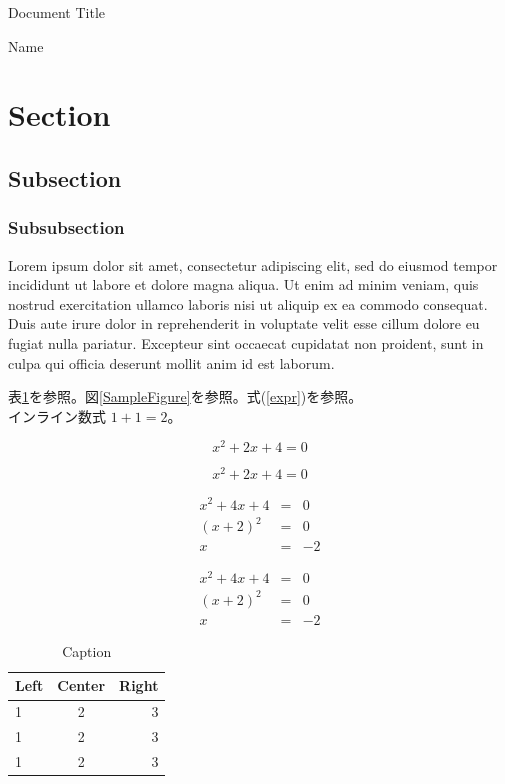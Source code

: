 \documentclass[dvipdfmx,12pt]{ujarticle}
\newcommand{\Title}[1]{
    \begin{center}
        {\Large #1}
    \end{center}
}
\newcommand{\Right}[1]{
    \begin{flushright}
        #1
    \end{flushright}
}
\begin{document}
\Title{Document Title}
\Right{Name}

\section{Section}
\subsection{Subsection}
\subsubsection{Subsubsection}

Lorem ipsum dolor sit amet, consectetur adipiscing elit, sed do eiusmod tempor incididunt ut labore et dolore magna aliqua. Ut enim ad minim veniam, quis nostrud exercitation ullamco laboris nisi ut aliquip ex ea commodo consequat. Duis aute irure dolor in reprehenderit in voluptate velit esse cillum dolore eu fugiat nulla pariatur. Excepteur sint occaecat cupidatat non proident, sunt in culpa qui officia deserunt mollit anim id est laborum.

表\ref{SampleTable}を参照。図\ref{SampleFigure}を参照。式(\ref{expr})を参照。\\インライン数式 $ 1 + 1 = 2 $。


\begin{equation}
    \label{expr}
    x^2 + 2x + 4 = 0
\end{equation}

\begin{displaymath}
    x^2 + 2x + 4 = 0
\end{displaymath}

\begin{eqnarray}
    x ^ 2 + 4x + 4 &=& 0 \nonumber \\
    (x + 2) ^ 2 &=& 0 \nonumber \\
    x &=& -2
\end{eqnarray}

\begin{eqnarray*}
    x ^ 2 + 4x + 4 &=& 0 \\
    (x + 2) ^ 2 &=& 0 \\
    x &=& -2
\end{eqnarray*}

\begin{table}[ht]
    \caption{Caption}
    \label{SampleTable}
    \centering
    \begin{tabular}{lcr}
        \hline
        Left & Center & Right \\
        \hline \hline
        1 & 2 & 3 \\
        1 & 2 & 3 \\
        1 & 2 & 3 \\
        \hline
    \end{tabular}
\end{table}
\end{document}
